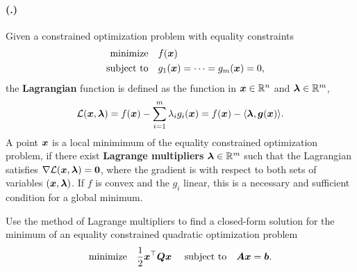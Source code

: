 \documentclass{article}
\newcounter{problemSheetNumber}
\newcounter{problems}
\renewcommand{\problem}{\paragraph{(\theproblemSheetNumber.\theproblems)}\addtocounter{problems}{1}}
\begin{document}
\problem Given a constrained optimization problem with equality constraints
\begin{align*}
  \text{minimize}\quad & f(\bm{x})\\
  \quad\text{subject to}\quad & g_1(\bm{x}) = \cdots = g_m(\bm{x}) = 0,
\end{align*}
the \textbf{Lagrangian} function is defined as the function in $\bm{x}\in \mathbb{R}^n$ and $\bm{\lambda}\in \mathbb{R}^m$,
\begin{equation*}
  \mathcal{L}(\bm{x},\bm{\lambda}) = f(\bm{x})-\sum_{i=1}^m \lambda_i g_i(\bm{x}) = f(\bm{x})-\langle {\bm{\lambda}}, {\bm{g}(\bm{x})} \rangle.
\end{equation*}
A point $\bm{x}$ is a local minimimum of the equality constrained optimization problem, if there exist \textbf{Lagrange multipliers} $\bm{\lambda}\in \mathbb{R}^m$ such that the Lagrangian satisfies $\nabla \mathcal{L}(\bm{x},\bm{\lambda})=\bm{0}$, where the gradient is with respect to both sets of variables $(\bm{x},\bm{\lambda})$. If $f$ is convex and the $g_i$ linear, this is a necessary and sufficient condition for a global minimum.

Use the method of Lagrange multipliers to find a closed-form solution for the minimum of an equality constrained quadratic optimization problem
\begin{equation*}
\text{minimize}\quad \frac{1}{2}\bm{x}^{\top}\bm{Q}\bm{x} \ \quad\text{subject to}\quad \bm{A}\bm{x}=\bm{b}.
\end{equation*}
%
\end{document}
